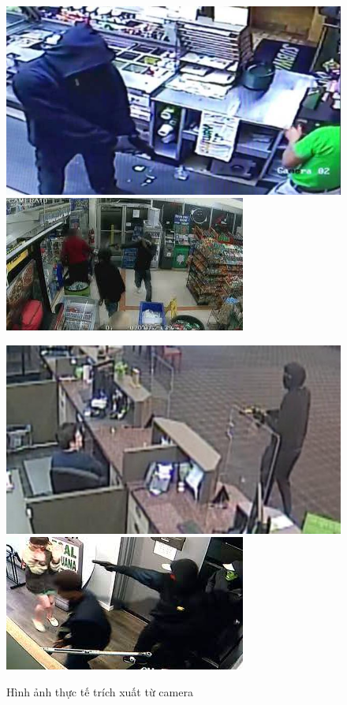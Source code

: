 \documentclass[a4paper]{article}
\begin{document}
\begin{figure}[h]
	\center
	\begin{multicols}{2}
		\includegraphics[width=0.8\linewidth]{fig/subway-robbery-1-1552568509}
		\includegraphics[width=0.8\linewidth]{fig/images}
	\end{multicols}
	\begin{multicols}{2}
		\includegraphics[width=0.8\linewidth]{fig/z5092842635515_66bf7170494f95e3b6d809a5e2e48128}
		\includegraphics[width=0.8\linewidth]{fig/download}
	\end{multicols}
	\captionsetup{justification=centering}
	\caption{Hình ảnh thực tế trích xuất từ camera}
	\label{fig:example1}
\end{figure} 
\end{document}
